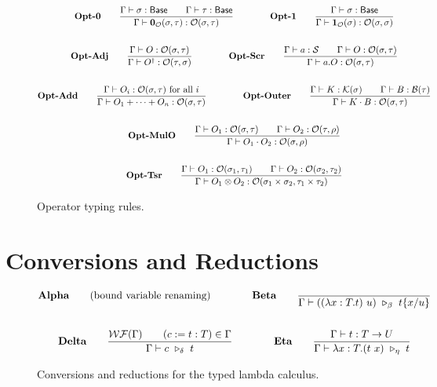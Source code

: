 \documentclass{article}
\begin{document}
\begin{figure}[h]
    \begin{gather*}
        \textbf{Opt-0} \qquad
        \frac{\Gamma \vdash \sigma : \mathsf{Base} \qquad \Gamma \vdash \tau : \mathsf{Base}}{\Gamma \vdash \mathbf{0}_\mathcal{O}(\sigma, \tau) : \mathcal{O}(\sigma, \tau)} 
        \qquad \qquad
        \textbf{Opt-1} \qquad
        \frac{\Gamma \vdash \sigma : \mathsf{Base}}{\Gamma \vdash \mathbf{1}_\mathcal{O}(\sigma) : \mathcal{O}(\sigma, \sigma)} \\
        \\
        \textbf{Opt-Adj} \qquad
        \frac{\Gamma \vdash O : \mathcal{O}(\sigma, \tau)}{\Gamma \vdash O^\dagger : \mathcal{O}(\tau, \sigma)} 
        \qquad \qquad
        \textbf{Opt-Scr} \qquad
        \frac{\Gamma \vdash a : \mathcal{S} \qquad \Gamma \vdash O : \mathcal{O}(\sigma, \tau)}{\Gamma \vdash a.O : \mathcal{O}(\sigma, \tau)} \\
        \\
        \textbf{Opt-Add} \qquad
        \frac{\Gamma \vdash O_i : \mathcal{O}(\sigma, \tau) \text{ for all $i$}}{\Gamma \vdash O_1 + \cdots + O_n : \mathcal{O}(\sigma, \tau)}
        \qquad \qquad
        \textbf{Opt-Outer} \qquad
        \frac{\Gamma\vdash K : \mathcal{K}(\sigma) \qquad \Gamma\vdash B : \mathcal{B}(\tau)}{\Gamma\vdash K \cdot B : \mathcal{O}(\sigma, \tau)} \\
        \\
        \textbf{Opt-MulO} \qquad
        \frac{\Gamma \vdash O_1 : \mathcal{O}(\sigma, \tau) \qquad \Gamma \vdash O_2 : \mathcal{O}(\tau, \rho)}{\Gamma \vdash O_1 \cdot O_2 : \mathcal{O}(\sigma, \rho)} \\
        \\
        \textbf{Opt-Tsr} \qquad
        \frac{\Gamma \vdash O_1 : \mathcal{O}(\sigma_1, \tau_1) \qquad \Gamma \vdash O_2 : \mathcal{O}(\sigma_2, \tau_2)} {\Gamma \vdash O_1 \otimes O_2 : \mathcal{O}(\sigma_1 \times \sigma_2, \tau_1 \times \tau_2)}
    \end{gather*}
    \caption{Operator typing rules.}
\end{figure}

\clearpage
\section{Conversions and Reductions}
\begin{figure}[h]
    \begin{gather*}
        \textbf{Alpha} \qquad \text{(bound variable renaming)}
        \qquad \qquad
        \textbf{Beta} \qquad
        \frac{}{\Gamma \vdash ((\lambda x:T.t)\ u)\ \reduce_\beta\ t\{x/u\}} \\
        \\
        \textbf{Delta} \qquad
        \frac{\WF(\Gamma) \qquad (c:=t:T) \in \Gamma}{\Gamma \vdash c\ \reduce_\delta\ t}
        \qquad \qquad
        \textbf{Eta} \qquad
        \frac{\Gamma\vdash t : T \to U}{\Gamma \vdash \lambda x : T . (t\ x)\ \reduce_\eta\ t}
    \end{gather*}
    \caption{Conversions and reductions for the typed lambda calculus.}
\end{figure}
\end{document}
